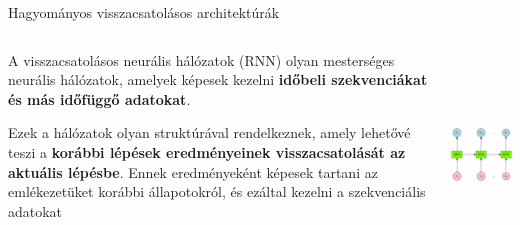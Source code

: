 \documentclass[english, aspectratio=169]{beamer}
\begin{document}
\begin{frame}{Hagyományos visszacsatolásos architektúrák}
\begin{columns}
\begin{column}{.5\textwidth}
A visszacsatolásos neurális hálózatok (RNN) olyan mesterséges neurális hálózatok, amelyek képesek kezelni \textbf{időbeli szekvenciákat és más időfüggő adatokat}.\par\smallskip
Ezek a hálózatok olyan struktúrával rendelkeznek, amely lehetővé teszi a \textbf{korábbi lépések eredményeinek visszacsatolását az aktuális lépésbe}. Ennek eredményeként képesek tartani az emlékezetüket korábbi állapotokról, és ezáltal kezelni a szekvenciális adatokat
\end{column}
\begin{column}{.5\textwidth}
\begin{center}
\includegraphics[height=5.5cm, width=\textwidth, keepaspectratio]{../../10_recurrent/doc/graphs/recurrent_4.png}
\end{center}
\end{column}
\end{columns}
\end{frame}
\end{document}
